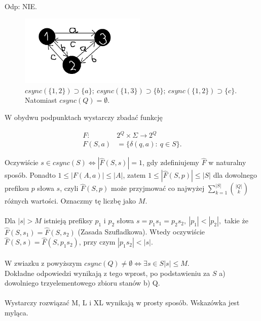 \documentclass[a4paper,11pt]{article}
\newenvironment{zadanie}[1]
  {\renewcommand\theinnercustomthm{#1}\innercustomthm}
  {\endinnercustomthm}
\begin{document}
Odp: NIE. \\


\begin{figure}[h!]
  \centerline{%
    \includegraphics[width=6cm]{zad40.png}%
  }%
  \caption{$csync(\{1,2\}) \supset \{a\}; \ csync(\{1,3\}) \supset \{b\};\ csync(\{1,2\}) \supset \{c\}$. Natomiast $csync(Q) = \emptyset $.}
\end{figure}


\begin{zadanie}{41}
\end{zadanie}
W obydwu podpunktach wystarczy zbadać funkcję

\begin{align*}
 F :\ &2^Q \times \Sigma \longrightarrow 2^Q \\
 F(S,a) &= \{ \delta(q,a) : \ q \in S \}.
\end{align*}

Oczywiście $s \in csync(S) \Longleftrightarrow |\widehat{F}(S,s)| = 1$, gdy zdefiniujemy $\widehat{F}$ w naturalny sposób. 
Ponadto $1 \leqslant |F(A,a)| \leqslant |A|$, zatem $1 \leqslant |\widehat{F}(S,p)| \leqslant |S|$ dla dowolnego prefiksu $p$ słowa $s$,
czyli $\widehat{F}(S,p)$ może przyjmować co najwyżej $\displaystyle{\sum\limits^{|S|}_{k=1}\binom{|Q|}{k}}$ różnych wartości.
Oznaczmy tę liczbę jako $M$. \\ \\

Dla $|s| > M$ istnieją prefiksy $p_1$ i $p_2$ słowa $s = p_1s_1 = p_2s_2, \ |p_1| < |p_2|,$ takie że 
$\widehat{F}(S,s_1) = \widehat{F}(S,s_2)$ (Zasada Szufladkowa). Wtedy oczywiście $\widehat{F}(S,s) = \widehat{F}(S,p_1s_2)$, przy czym 
$|p_1s_2| < |s|$. \\ \\
W zwiazku z powyższym $csync(Q) \neq \emptyset \Longleftrightarrow \exists s \in S |s| \leqslant M$. \\
Dokładne odpowiedzi wynikają z tego wprost, po podstawieniu za $S$ a) dowolniego trzyelementowego zbioru stanów b) Q. \\ \\

\begin{zadanie}{42}
\end{zadanie}
Wystarczy rozwiązać M, L i XL wynikają w prosty sposób. Wskazówka jest myląca. \\ \\
\end{document}
